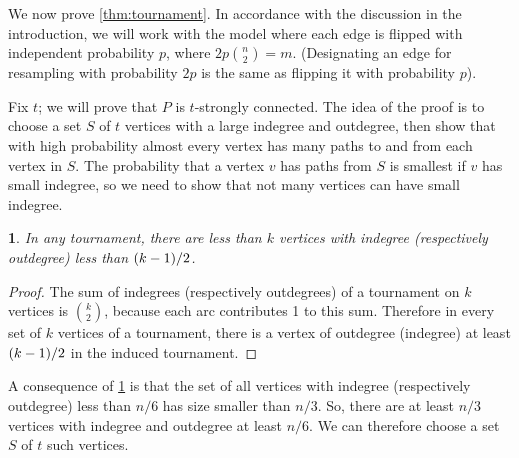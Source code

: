 \documentclass[11pt,english]{article}
\theoremstyle{plain}
\theoremstyle{definition}
\theoremstyle{definition}
\theoremstyle{plain}
\theoremstyle{plain}
\theoremstyle{plain}
\newtheorem{lem}[thm]{\protect\lemmaname}
\theoremstyle{plain}
\theoremstyle{remark}
\theoremstyle{remark}
\let\originalleft\left
\let\originalright\right
\renewcommand{\left}{\mathopen{}\mathclose\bgroup\originalleft}
\renewcommand{\right}{\aftergroup\egroup\originalright}
\providecommand{\lemmaname}{Lemma}
\begin{document}
We now prove \ref{thm:tournament}. In accordance with the discussion
in the introduction, we will work with the model where each edge is
flipped with independent probability $p$, where $2p{n \choose 2}=m$.
(Designating an edge for resampling with probability $2p$ is the
same as flipping it with probability $p$).

Fix $t$; we will prove that $P$ is $t$-strongly connected. The
idea of the proof is to choose a set $S$ of $t$ vertices with a
large indegree and outdegree, then show that with high probability
almost every vertex has many paths to and from each vertex in $S$.
The probability that a vertex $v$ has paths from $S$ is smallest
if $v$ has small indegree, so we need to show that not many vertices
can have small indegree.
\begin{lem}
\label{lem:extreme-indegree-bound}In any tournament, there are less
than $k$ vertices with indegree (respectively outdegree) less than
$\left(k-1\right)/2$.\end{lem}
\begin{proof}
The sum of indegrees (respectively outdegrees) of a tournament on
$k$ vertices is ${k \choose 2}$, because each arc contributes 1
to this sum. Therefore in every set of $k$ vertices of a tournament,
there is a vertex of outdegree (indegree) at least $\left(k-1\right)/2$
in the induced tournament.
\end{proof}
A consequence of \ref{lem:extreme-indegree-bound} is that the set
of all vertices with indegree (respectively outdegree) less than $n/6$
has size smaller than $n/3$. So, there are at least $n/3$ vertices
with indegree and outdegree at least $n/6$. We can therefore choose
a set $S$ of $t$ such vertices.
\end{document}
